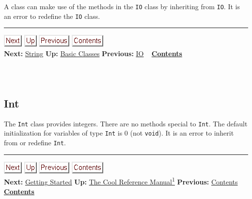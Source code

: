 \documentclass[]{article}
\begin{document}
A class can make use of the methods in the \texttt{IO} class by
inheriting from \texttt{IO}. It is an error to redefine the \texttt{IO}
class.

\begin{center}\rule{3in}{0.4pt}\end{center}

\href{node30.html}{\includegraphics{next.png}}
\href{node26.html}{\includegraphics{up.png}}
\href{node28.html}{\includegraphics{prev.png}}
\href{node1.html}{\includegraphics{contents.png}} \\ \textbf{Next:}
\href{node30.html}{String} \textbf{Up:} \href{node26.html}{Basic
Classes} \textbf{Previous:} \href{node28.html}{IO} ~
\textbf{\href{node1.html}{Contents}} \\ \\

\subsection{\\ Int}

The \texttt{Int} class provides integers. There are no methods special
to \texttt{Int}. The default initialization for variables of type
\texttt{Int} is 0 (not \texttt{void}). It is an error to inherit from or
redefine \texttt{Int}.

\begin{center}\rule{3in}{0.4pt}\end{center}

\href{node3.html}{\includegraphics{next.png}}
\href{cool-manual.html}{\includegraphics{up.png}}
\href{node1.html}{\includegraphics{prev.png}}
\href{node1.html}{\includegraphics{contents.png}} \\ \textbf{Next:}
\href{node3.html}{Getting Started} \textbf{Up:}
\href{cool-manual.html}{The Cool Reference Manual\textsuperscript{1}}
\textbf{Previous:} \href{node1.html}{Contents} ~
\textbf{\href{node1.html}{Contents}} \\ \\
\end{document}
